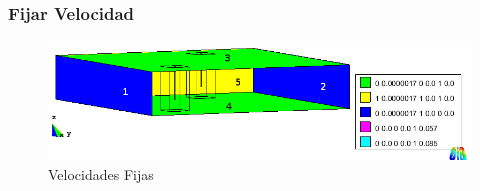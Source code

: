 \documentclass[spanish]{beamer}
\begin{document}
\subsubsection{Fijar Velocidad}
\begin{frame}\begin{center}
\begin{figure}[tbhp]
\centerline{\includegraphics[scale=0.4]{../img/100m/100_condiciones_fijar_velocidad_perspectiva_interior_leyendas}}
\caption{Velocidades Fijas}
\label{100_condiciones_fijar_velocidad_perspectiva_interior_leyendas}
\end{figure}
\end{center}
\end{frame}
%
\end{document}
